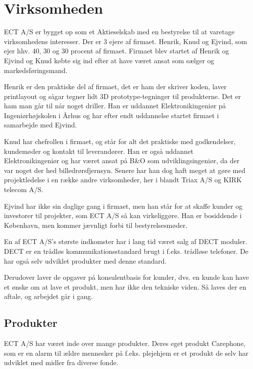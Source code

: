 \chapter{Virksomheden}

ECT A/S er bygget op som et Aktieselskab med en bestyrelse til at varetage virksomhedens interesser. Der er 3 ejere af firmaet. Henrik, Knud og Ejvind, som ejer hhv. 40, 30 og 30 procent af firmaet. Firmaet blev startet af Henrik og Ejvind og Knud købte sig ind efter at have været ansat som sælger og markedsføringsmand.

Henrik er den praktiske del af firmaet, det er ham der skriver koden, laver printlayout og sågar tegner lidt 3D prototype-tegninger til produkterne. Det er ham man går til når noget driller. Han er uddannet Elektronikingeniør på Ingeniørhøjskolen i Århus og har efter endt uddannelse startet firmaet i samarbejde med Ejvind.

Knud har chefrollen i firmaet, og står for alt det praktiske med godkendelser, kundemøder og kontakt til leverandører. Han er også uddannet Elektronikingeniør og har været ansat på B\&O som udviklingsingeniør, da der var noget der hed billedrørsfjernsyn. Senere har han dog haft meget at gøre med projektledelse i en række andre virksomheder, her i blandt Triax A/S og KIRK telecom A/S.

Ejvind har ikke sin daglige gang i firmaet, men han står for at skaffe kunder og investorer til projekter, som ECT A/S så kan virkeliggøre. Han er bosiddende i København, men kommer jævnligt forbi til bestyrelsesmøder.

En af ECT A/S's største indkomster har i lang tid været salg af DECT moduler. DECT er en trådløs kommunikationsstandard brugt i f.eks. trådløse telefoner. De har også selv udviklet produkter med denne standard.

Derudover laver de opgaver på konsulentbasis for kunder, dvs. en kunde kan have et ønske om at lave et produkt, men har ikke den tekniske viden. Så laves der en aftale, og arbejdet går i gang.

\newpage
\section{Produkter}

ECT A/S har været inde over mange produkter. Deres eget produkt Carephone, som er en alarm til ældre mennesker på f.eks. plejehjem er et produkt de selv har udviklet med midler fra diverse fonde.


